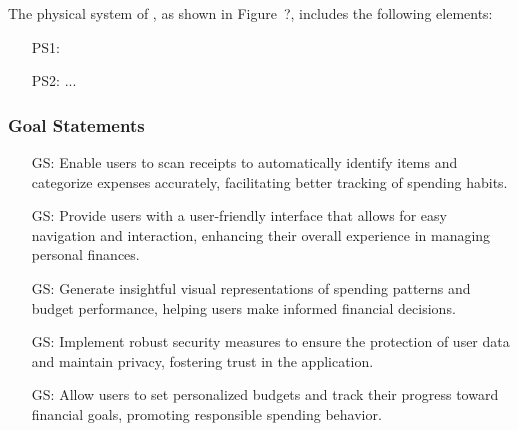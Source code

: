 \documentclass[12pt]{article}
\newcounter{goalnum} %
\begin{document}
The physical system of \progname{}, as shown in Figure~?,
includes the following elements:

\begin{itemize}

\item[PS1:] 

\item[PS2:] ...

\end{itemize}





\subsubsection{Goal Statements}

\begin{itemize}
  \item[GS\refstepcounter{goalnum}\thegoalnum \label{G_scanReceipts}:] 
  Enable users to scan receipts to automatically identify items and categorize expenses accurately, facilitating better tracking of spending habits.
  
  \item[GS\refstepcounter{goalnum}\thegoalnum \label{G_userFriendly}:] 
  Provide users with a user-friendly interface that allows for easy navigation and interaction, enhancing their overall experience in managing personal finances.
  
  \item[GS\refstepcounter{goalnum}\thegoalnum \label{G_visualRepresentations}:] 
  Generate insightful visual representations of spending patterns and budget performance, helping users make informed financial decisions.
  
  \item[GS\refstepcounter{goalnum}\thegoalnum \label{G_securityMeasures}:] 
  Implement robust security measures to ensure the protection of user data and maintain privacy, fostering trust in the application.
  
  \item[GS\refstepcounter{goalnum}\thegoalnum \label{G_personalizedBudgets}:] 
  Allow users to set personalized budgets and track their progress toward financial goals, promoting responsible spending behavior.
\end{itemize}
\end{document}
